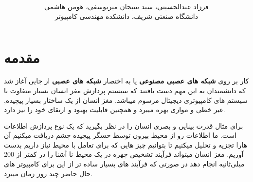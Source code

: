 \documentclass[11pt,a4paper,twocolumn]{article}
\begin{document}
\title{
}
\author{فرزاد عبدالحسینی، سید سبحان میریوسفی، هومن هاشمی\\
دانشگاه صنعتی شریف، دانشکده مهندسی کامپیوتر\\
}
\section{مقدمه}
کار بر روی
\textbf{شبکه های عصبی مصنوعی}
یا به اختصار
\textbf{شبکه های عصبی}
از جایی آغاز شد که دانشمندان به این مهم دست یافتند که سیستم پردازش مغز انسان بسیار متفاوت با سیستم های کامپیوتری دیجیتال مرسوم میباشد. مغز انسان از یک ساختار بسیار پیچیده, غیر خطی و موازی بهره میبرد و همچنین قابلیت بهبود و ارتقای خود را نیز دارد.

برای مثال قدرت بینایی و بصری انسان را در نظر بگیرید که یک نوع پردازش اطلاعات است. ما اطلاعات رو از محیط بیرون توسط حسگر پیچیده چشم دریافت میکنیم آن هارا تجزیه و تحلیل میکنیم تا بتوانیم چیز هایی که برای تعامل با محیط نیاز داریم بدست آوریم. مغز انسان میتواند فرآیند تشخیص چهره در یک محیط نا آشنا را در کمتر از 200 میلی‌ثانیه انجام دهد در صورتی که فرآیند های بسیار ساده تر از این برای کامپیوتر های حال حاضر چند روز زمان میبرد.
\end{document}
